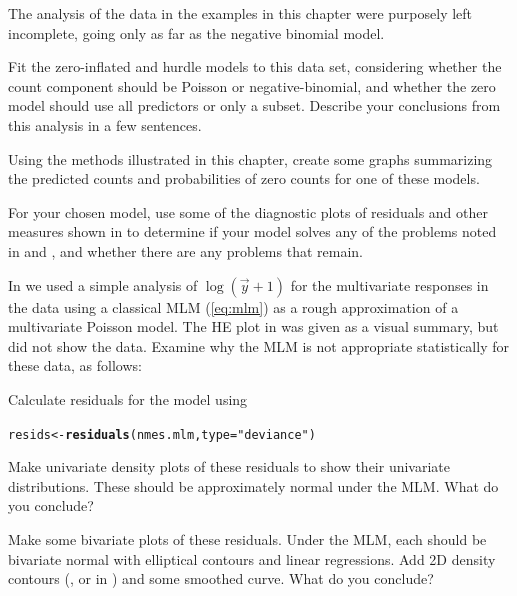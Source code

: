 \documentclass[11pt]{book}\usepackage[]{graphicx}\usepackage[]{color}
\makeatletter
\newcommand{\hlstr}[1]{\textcolor[rgb]{0.192,0.494,0.8}{#1}}%
\newcommand{\hlstd}[1]{\textcolor[rgb]{0.345,0.345,0.345}{#1}}%
\newcommand{\hlkwb}[1]{\textcolor[rgb]{0.69,0.353,0.396}{#1}}%
\newcommand{\hlkwc}[1]{\textcolor[rgb]{0.333,0.667,0.333}{#1}}%
\newcommand{\hlkwd}[1]{\textcolor[rgb]{0.737,0.353,0.396}{\textbf{#1}}}%
\newenvironment{kframe}{%
 \def\at@end@of@kframe{}%
 \ifinner\ifhmode%
  \def\at@end@of@kframe{\end{minipage}}%
  \begin{minipage}{\columnwidth}%
 \fi\fi%
 \def\FrameCommand##1{\hskip\@totalleftmargin \hskip-\fboxsep
 \colorbox{shadecolor}{##1}\hskip-\fboxsep
     \hskip-\linewidth \hskip-\@totalleftmargin \hskip\columnwidth}%
 \MakeFramed {\advance\hsize-\width
   \@totalleftmargin\z@ \linewidth\hsize
   \@setminipage}}%
 {\par\unskip\endMakeFramed%
 \at@end@of@kframe}
\newenvironment{knitrout}{}{} %
\renewenvironment{knitrout}{\small\renewcommand{\baselinestretch}{.85}}{} %
\makeatother
\begin{document}
\begin{Exercises}
  \exercise The analysis of the  data in the examples in this chapter were purposely left incomplete,
  going only as far as the negative binomial model.
  \begin{enumerate*}
    \item Fit the zero-inflated and hurdle models to this data set, considering whether the count component should
    be Poisson or negative-binomial, and whether the zero model should use all predictors or only a subset.
    Describe your conclusions from this analysis in a few sentences.
    \item Using the methods illustrated in this chapter, create some graphs summarizing the predicted counts
    and probabilities of zero counts for one of these models.
    \item For your chosen model, use some of the diagnostic plots of residuals and other measures shown in 
     to determine if your model solves any of the problems noted in 
    and , and whether there are any problems that remain.
  \end{enumerate*}

  \exercise In  we used a simple analysis of $\log(\vec{y}+1)$ for the multivariate responses
  in the  data using a classical MLM (\eqref{eq:mlm})
  as a rough approximation of a multivariate Poisson model.
  The HE plot in  was given as a visual summary, but did not show the data.
  Examine why the MLM is not appropriate statistically for these data, as follows:
  \begin{enumerate*}
    \item Calculate residuals for the model  using
\begin{knitrout}
\color{fgcolor}\begin{kframe}
\begin{alltt}
\hlstd{resids} \hlkwb{<-} \hlkwd{residuals}\hlstd{(nmes.mlm,} \hlkwc{type}\hlstd{=}\hlstr{"deviance"}\hlstd{)}
\end{alltt}
\end{kframe}
\end{knitrout}
    \item Make univariate density plots of these residuals to show their univariate distributions.
    These should be approximately normal under the MLM.  What do you conclude?
    \item Make some bivariate plots of these residuals. Under the MLM, each should be bivariate normal
    with elliptical contours and linear regressions. Add 2D density contours 
    (, or  in ) and some smoothed curve. 
     What do you conclude?

  \end{enumerate*}

\end{Exercises}
\end{document}
